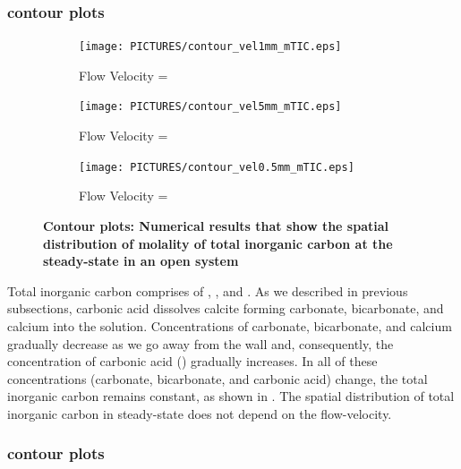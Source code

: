 \subsubsection*{ contour plots} \label{sssec:contourmTIC}
\begin{figure}[!h]
\centering
    \begin{subfigure}{.5\linewidth}
        \centering
        \texttt{[image: PICTURES/contour\_vel1mm\_mTIC.eps]}
        \caption{\small Flow Velocity = }
        \label{fig:TICSteady-state}       %
    \end{subfigure}%
    \hfill
    \begin{subfigure}{.5\linewidth}
        \centering
        \texttt{[image: PICTURES/contour\_vel5mm\_mTIC.eps]}
        \caption{\small Flow Velocity = }
        \label{fig:TICSteady-state5mm}       %
    \end{subfigure}%
    \hfill
    \begin{subfigure}{.5\linewidth}
        \centering
        \texttt{[image: PICTURES/contour\_vel0.5mm\_mTIC.eps]}
        \caption{\small Flow Velocity = }
        \label{fig:TICSteady-state0.5mm}       %
    \end{subfigure}%
    \caption [\DuMuX Contour plots: Numerical results that show the spatial distribution of molality of total 
    inorganic carbon at the steady-state in an open system] {\textbf{\DuMuX Contour plots: Numerical results that show the spatial distribution of molality of total 
    inorganic carbon at the steady-state in an open system}}
     \label{fig:contourTIC}
\end{figure}

Total inorganic carbon comprises of , ,  and . As we described in previous subsections, 
carbonic acid dissolves calcite forming carbonate, bicarbonate, and calcium into the solution. Concentrations of carbonate, bicarbonate, and calcium 
gradually decrease as we go away from the wall and, consequently, the concentration of carbonic acid () gradually increases. 
In all of these concentrations (carbonate, bicarbonate, and carbonic acid) change, the total inorganic carbon remains constant, as shown in .
The spatial distribution of total inorganic carbon in steady-state does not depend on the flow-velocity. 

\subsubsection*{ contour plots} \label{sssec:contourmCa}

